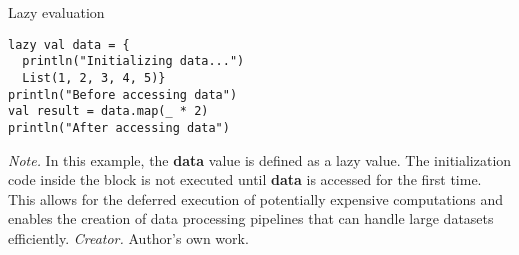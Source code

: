 \begin{table}[H]
\caption{Lazy evaluation}
\begin{lstlisting}
lazy val data = {
  println("Initializing data...")
  List(1, 2, 3, 4, 5)}
println("Before accessing data")
val result = data.map(_ * 2)
println("After accessing data")
\end{lstlisting}
\small
\textit{Note.} In this example, the \textbf{data} value is defined as a lazy value. The initialization code inside the block is not executed until \textbf{data} is accessed for the first time. This allows for the deferred execution of potentially expensive computations and enables the creation of data processing pipelines that can handle large datasets efficiently.
\textit{Creator.} Author's own work.
\end{table}